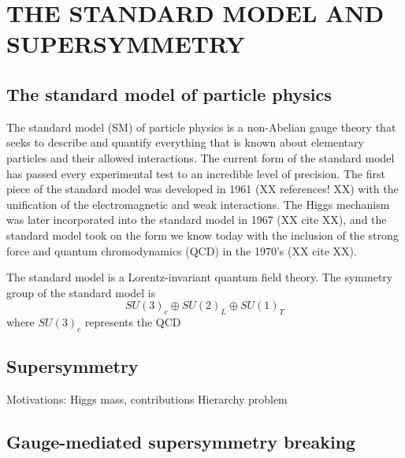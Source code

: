\chapter{THE STANDARD MODEL AND SUPERSYMMETRY}
\label{chap:theory}

\section{The standard model of particle physics}
\label{sec:StandardModel}
The standard model (SM) of particle physics is a non-Abelian gauge theory that seeks to describe and quantify everything that is known about elementary particles and their allowed interactions. The current form of the standard model has passed every experimental test to an incredible level of precision. The first piece of the standard model was developed in 1961 (XX references! XX) with the unification of the electromagnetic and weak interactions. The Higgs mechanism was later incorporated into the standard model in 1967 (XX cite XX), and the standard model took on the form we know today with the inclusion of the strong force and quantum chromodynamics (QCD) in the 1970's (XX cite XX).

The standard model is a Lorentz-invariant quantum field theory. The symmetry group of the standard model is 
\begin{equation}
SU(3)_c \oplus SU(2)_L \oplus SU(1)_\Upsilon
\end{equation}
where $SU(3)_c$ represents the QCD


\section{Supersymmetry}
\label{sec:SUSY}

Motivations:
Higgs mass, contributions 
Hierarchy problem 

\section{Gauge-mediated supersymmetry breaking}
\label{sec:gmsb}

